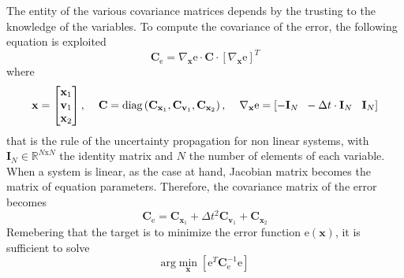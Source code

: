\documentclass[12pt,a4paper]{book}
\begin{document}
The entity of the various covariance matrices depends by the trusting to the knowledge of the variables. To compute the covariance of the error, the following equation is exploited
\begin{equation}
\mathbf{C}_{\text{e}} = \nabla_\mathbf{x}\text{e} \cdot \mathbf{C} \cdot \left[\nabla_\mathbf{x}\text{e}\right]^T
\label{UncertPropagation}
\end{equation}
where
\begin{equation*}
\mathbf{x} = 
\begin{bmatrix}
\mathbf{x}_1 \\ \mathbf{v}_1 \\ \mathbf{x}_2 
\end{bmatrix}, 
\hspace*{0.4cm}
\mathbf{C}=\text{diag}\left(\mathbf{C}_{\mathbf{x}_1},\mathbf{C}_{\mathbf{v}_1},\mathbf{C}_{\mathbf{x}_2}\right),
\hspace*{0.4cm}
\nabla_\mathbf{x}\text{e} = 
\left[-\mathbf{I}_N \hspace*{0.2cm} -\Delta t \cdot \mathbf{I}_N \hspace*{0.3cm} \mathbf{I}_N\right]
\end{equation*}
that is the rule of the uncertainty propagation for non linear systems, with $\mathbf{I}_N \in \mathbb{R}^{N\text{x}N}$ the identity matrix and $N$ the number of elements of each variable. When a system is linear, as the case at hand, Jacobian matrix becomes the matrix of equation parameters. Therefore, the covariance matrix of the error becomes
\begin{equation}
\mathbf{C}_{\text{e}}=\mathbf{C}_{\mathbf{x}_1}+\Delta t^2 \mathbf{C}_{\mathbf{v}_1}+\mathbf{C}_{\mathbf{x}_2}
\label{errCov}
\end{equation}
Remebering that the target is to minimize the error function $\text{e}(\mathbf{x})$, it is sufficient to solve
\begin{equation}
\text{arg}\min_\mathbf{x}\left[\text{e}^T\mathbf{C}_\text{e}^{-1}\text{e}\right]
\label{LS}
\end{equation}
\end{document}
